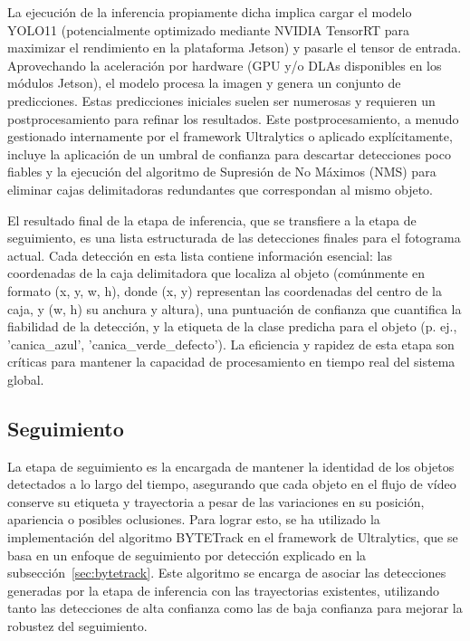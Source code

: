 \documentclass[11pt,spanish,listoffigures,listoftables]{tfgetsinf}
\begin{document}
La ejecución de la inferencia propiamente dicha implica cargar el modelo YOLO11 (potencialmente optimizado mediante NVIDIA TensorRT para maximizar el rendimiento en la plataforma Jetson) y pasarle el tensor de entrada. Aprovechando la aceleración por hardware (GPU y/o DLAs disponibles en los módulos Jetson), el modelo procesa la imagen y genera un conjunto de predicciones. Estas predicciones iniciales suelen ser numerosas y requieren un postprocesamiento para refinar los resultados. Este postprocesamiento, a menudo gestionado internamente por el framework Ultralytics o aplicado explícitamente, incluye la aplicación de un umbral de confianza para descartar detecciones poco fiables y la ejecución del algoritmo de Supresión de No Máximos (NMS) para eliminar cajas delimitadoras redundantes que correspondan al mismo objeto.

El resultado final de la etapa de inferencia, que se transfiere a la etapa de seguimiento, es una lista estructurada de las detecciones finales para el fotograma actual. Cada detección en esta lista contiene información esencial: las coordenadas de la caja delimitadora que localiza al objeto (comúnmente en formato (x, y, w, h), donde (x, y) representan las coordenadas del centro de la caja, y (w, h) su anchura y altura), una puntuación de confianza que cuantifica la fiabilidad de la detección, y la etiqueta de la clase predicha para el objeto (p. ej., 'canica\_azul', 'canica\_verde\_defecto'). La eficiencia y rapidez de esta etapa son críticas para mantener la capacidad de procesamiento en tiempo real del sistema global.

\subsection{Seguimiento}
La etapa de seguimiento es la encargada de mantener la identidad de los objetos detectados a lo largo del tiempo, asegurando que cada objeto en el flujo de vídeo conserve su etiqueta y trayectoria a pesar de las variaciones en su posición, apariencia o posibles oclusiones. Para lograr esto, se ha utilizado la implementación del algoritmo BYTETrack en el framework de Ultralytics\cite{Jocher_Ultralytics_YOLO_2023}, que se basa en un enfoque de seguimiento por detección explicado en la subsección~\ref{sec:bytetrack}. Este algoritmo se encarga de asociar las detecciones generadas por la etapa de inferencia con las trayectorias existentes, utilizando tanto las detecciones de alta confianza como las de baja confianza para mejorar la robustez del seguimiento.
\end{document}
